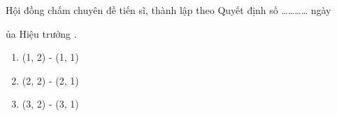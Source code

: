 
Hội đồng chấm chuyên đề tiến sĩ, thành lập theo Quyết định số ………… ngày \date của Hiệu trưởng \university.

\begin{enumerate}
	\item \board(1, 2) - \board(1, 1)
	\item \board(2, 2) - \board(2, 1)
	\item \board(3, 2) - \board(3, 1)
\end{enumerate}
